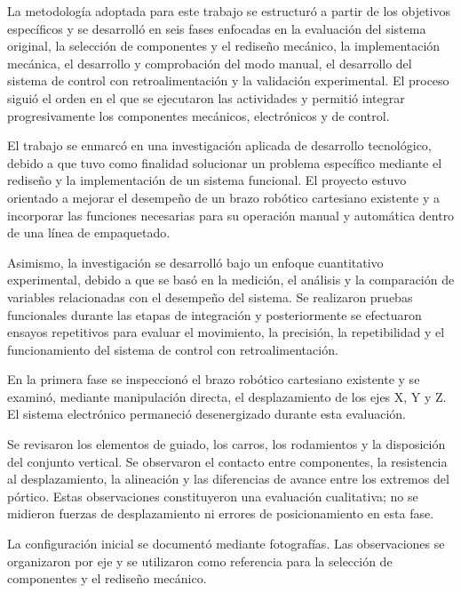 La metodología adoptada para este trabajo se estructuró a partir de los objetivos específicos y se desarrolló en seis fases enfocadas en la evaluación del sistema original, la selección de componentes y el rediseño mecánico, la implementación mecánica, el desarrollo y comprobación del modo manual, el desarrollo del sistema de control con retroalimentación y la validación experimental. El proceso siguió el orden en el que se ejecutaron las actividades y permitió integrar progresivamente los componentes mecánicos, electrónicos y de control.

El trabajo se enmarcó en una investigación aplicada de desarrollo tecnológico, debido a que tuvo como finalidad solucionar un problema específico mediante el rediseño y la implementación de un sistema funcional. El proyecto estuvo orientado a mejorar el desempeño de un brazo robótico cartesiano existente y a incorporar las funciones necesarias para su operación manual y automática dentro de una línea de empaquetado.

Asimismo, la investigación se desarrolló bajo un enfoque cuantitativo experimental, debido a que se basó en la medición, el análisis y la comparación de variables relacionadas con el desempeño del sistema. Se realizaron pruebas funcionales durante las etapas de integración y posteriormente se efectuaron ensayos repetitivos para evaluar el movimiento, la precisión, la repetibilidad y el funcionamiento del sistema de control con retroalimentación.



En la primera fase se inspeccionó el brazo robótico cartesiano existente y se examinó, mediante manipulación directa, el desplazamiento de los ejes X, Y y Z. El sistema electrónico permaneció desenergizado durante esta evaluación.

Se revisaron los elementos de guiado, los carros, los rodamientos y la disposición del conjunto vertical. Se observaron el contacto entre componentes, la resistencia al desplazamiento, la alineación y las diferencias de avance entre los extremos del pórtico. Estas observaciones constituyeron una evaluación cualitativa; no se midieron fuerzas de desplazamiento ni errores de posicionamiento en esta fase.

La configuración inicial se documentó mediante fotografías. Las observaciones se organizaron por eje y se utilizaron como referencia para la selección de componentes y el rediseño mecánico.


